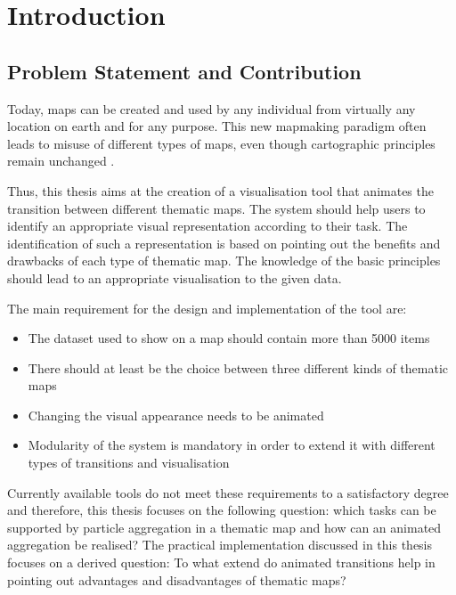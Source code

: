 \section{Introduction}


\subsection{Problem Statement and Contribution}
Today, maps can be created and used by any individual from virtually any location on earth and for any purpose. This new mapmaking paradigm often leads to misuse of different types of maps, even though cartographic principles remain unchanged .


Thus, this thesis aims at the creation of a visualisation tool that animates the transition between different thematic maps. The system should help users to identify an appropriate visual representation according to their task. The identification of such a representation is based on pointing out the benefits and drawbacks of each type of thematic map. The knowledge of the basic principles should lead to an appropriate visualisation to the given data.

The main requirement for the design and implementation of the tool are:
\begin{itemize}
\item The dataset used to show on a map should contain more than 5000 items
\item There should at least be the choice between three different kinds of thematic maps
\item Changing the visual appearance needs to be animated
\item Modularity of the system is mandatory in order to extend it with different types of transitions and visualisation
\end{itemize}
Currently available tools do not meet these requirements to a satisfactory degree and therefore, this thesis focuses on the following question:
which tasks can be supported by particle aggregation in a thematic map and how can an animated aggregation be realised? The practical implementation discussed in this thesis focuses on a derived question: To what extend do animated transitions help in pointing out advantages and disadvantages of thematic maps?

